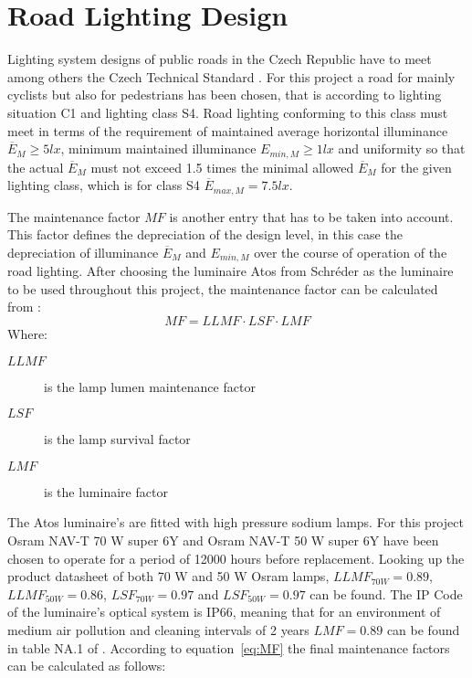 \section{Road Lighting Design}
Lighting system designs of public roads in the Czech Republic have to meet among others the Czech Technical Standard \cite{CSN_EN_13201-2}. For this project a road for mainly cyclists but also for pedestrians has been chosen, that is according to \cite{CSN_EN_13201-1} lighting situation C1 and lighting class S4. Road lighting conforming to this class must meet in terms of \cite{CSN_EN_13201-2} the requirement of maintained average horizontal illuminance $\overline{E}_{M}\geq 5 lx$, minimum maintained illuminance $E_{min,M}\geq 1 lx$ and uniformity so that the actual $\overline{E}_{M}$ must not exceed 1.5 times the minimal allowed $\overline{E}_{M}$ for the given lighting class, which is for class S4 $\overline{E}_{max,M} = 7.5 lx$.

The maintenance factor $MF$ is another entry that has to be taken into account. This factor defines the depreciation of the design level, in this case the depreciation of illuminance $\overline{E}_{M}$ and $E_{min,M}$ over the course of operation of the road lighting. After choosing the luminaire Atos from Schr\'{e}der as the luminaire to be used throughout this project, the maintenance factor can be calculated from \cite{CSN_EN_13201-2_Z1}:
\begin{equation} \label{eq:MF}
MF = LLMF \cdot LSF \cdot LMF
\end{equation}
Where:
\begin{description}
	\item[$LLMF$] is the lamp lumen maintenance factor
	\item[$LSF$] is the lamp survival factor
	\item[$LMF$] is the luminaire factor
\end{description}

The Atos luminaire's are fitted with high pressure sodium lamps. For this project Osram NAV-T 70 W super 6Y and Osram NAV-T 50 W super 6Y have been chosen to operate for a period of 12000 hours before replacement. Looking up the product datasheet \cite{Osram} of both 70 W and 50 W Osram lamps, $LLMF_{70W}=0.89$, $LLMF_{50W}=0.86$, $LSF_{70W}=0.97$ and $LSF_{50W}=0.97$ can be found. The IP Code of the luminaire's optical system is IP66, meaning that for an environment of medium air pollution and cleaning intervals of 2 years $LMF=0.89$ can be found in table NA.1 of \cite{CSN_EN_13201-2_Z1}. According to equation~\ref{eq:MF} the final maintenance factors can be calculated as follows:

